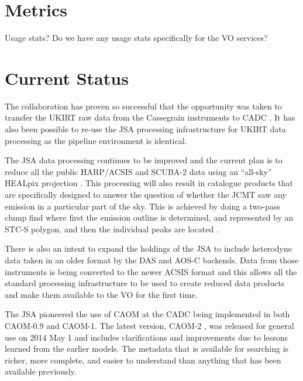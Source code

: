 \documentclass[final,authoryear,5p,times,twocolumn]{elsarticle}
\begin{document}
\section{Metrics}

{\color{red}
Usage stats? Do we have any usage stats specifically for the VO services?
}

\section{Current Status}

The collaboration has proven so successful that the opportunity was
taken to transfer the UKIRT raw data from the Cassegrain instruments
to CADC \citep{adassxxiii_P01}. It has also been possible to re-use
the JSA processing infrastructure for UKIRT data processing as the
pipeline environment is identical.

The JSA data processing continues to be improved
\citep{2014JCMTN35..19J} and the current plan is to reduce all the
public HARP/ACSIS and SCUBA-2 data using an ``all-sky'' HEALpix
projection \citep{2014SPIE9152-93,2014JCMTN35..20B}. This processing
will also result in catalogue products that are specifically designed
to answer the question of whether the JCMT saw any emission in a
particular part of the sky. This is achieved by doing a two-pass clump
find where first the emission outline is determined, and represented
by an STC-S polygon, and then the individual peaks are located
\citep{2014JCMTN35..21G}.

There is also an intent to expand the holdings of the JSA to include
heterodyne data taken in an older format by the DAS
\citep{1986SPIE..598..134B} and AOS-C backends. Data from those
instruments is being converted to the newer ACSIS format and this
allows all the standard processing infrastructure to be used to create
reduced data products and make them available to the VO for the first
time.

{\color{red}
The JSA pioneered the use of CAOM at the CADC being implemented in both
CAOM-0.9 and CAOM-1.  The latest version, CAOM-2
\citep{2013ASPC..475..159R,2012ASPC..461..339D},  was released for general
use on 2014 May 1 and includes clarifications and improvements due to
lessons learned from the earlier models.
The metadata that is available for searching is richer, more complete, and easier
to understand than anything that has been available previously.

}
\end{document}

